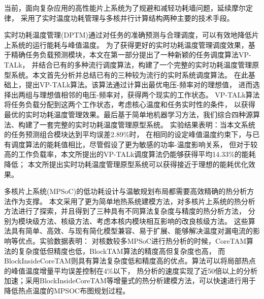 

{}

\makeatother



\begin{cabstract}

当前，面向复杂应用的高性能片上系统为了规避和减轻功耗墙问题，延续摩尔定律， 采用了实时温度功耗管理与多核并行计算结构两种主要的技术手段。


实时功耗温度管理(DPTM)通过对任务的准确预测与合理调度，可以有效地降低片上系统的运行能耗与峰值温度。 为了获得更好的实时功耗温度管理调度效果，基于精确任务负载预测模块，本文在第一部分提出了一种新颖的任务调度算法VP-TALk， 并结合已有的多种流行调度算法，构建了一个完整的实时功耗温度管理原型系统。本文首先分析并总结已有的三种较为流行的实时系统调度算法。 在此基础上，提出VP-TALk算法。该算法通过计算出最优电压-频率对的理想值， 进而选择出两组与理想值相邻的电压-频率对，获得两个现实的工作状态。 VP-TALk算法将任务负载分配到这两个工作状态，考虑核心温度和任务实时性的条件， 以获得最优的实时功耗温度管理效果。最后基于简单地机器学习方法，我们综合四种源算法、构建了一套完整的实时功耗温度管理原型系统。 实验结果表明：当本文系统的任务预测组合模块达到平均误差2.89\%时，
在相同的设定峰值温度约束下，与已有调度算法的能耗值相比，尽管假设了更为敏感的功率-温度影响关系， 但对于较高的工作负载率，本文所提出的VP-TALk调度算法仍能够获得平均14.33\%的能耗降低；
本文所提出实时功耗温度管理原型系统可以获得接近于理想的能耗优化效果。


多核片上系统(MPSoC)的低功耗设计与温敏规划布局都需要高效精确的热分析方法作为支撑。 本文采用了更为简单地热系统建模方法，对多核片上系统的热分析方法进行了探索，并且得到了三种具有不同算法复杂度与精度的热分析方法， 分别为模块级方法、核级方法、考虑本核内模块相互影响的改良核级方法。 这些算法具有简单、高效、与现有简化模型兼容、易于扩展、能够解决温度对漏电流的影响等优点。实验数据表明：
对核数较多MPSoC进行热分析的时候，CoreTAM算法的复杂度低但精度也低，BlockTAM算法的精度高但复杂度也高， 而BlockInsideCoreTAM则具有算法复杂度低和精度高的优点。算法可以将局部热点的峰值温度增量平均误差控制在4\%以下， 热分析的速度实现了近50倍以上的分析加速；采用BlockInsideCoreTAM等增量式的热分析建模方法，可以快速进行用于降低热点温度的MPSOC布图规划过程。


\end{cabstract}


